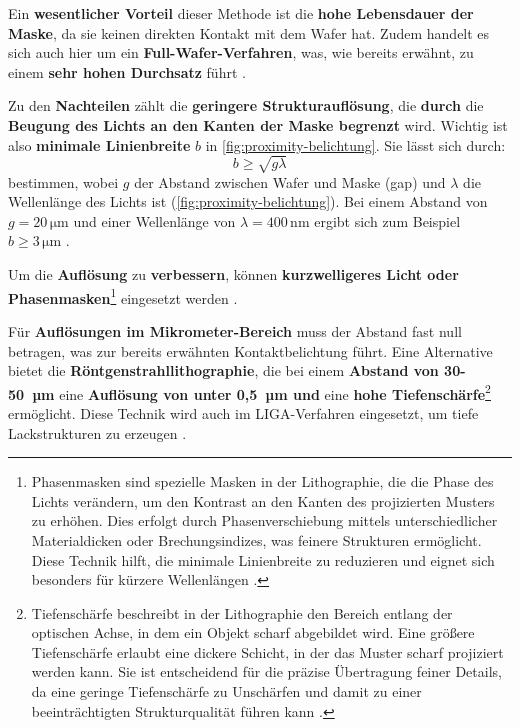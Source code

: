 \documentclass{article} %
\begin{document}
\vspace{1em}

Ein \textbf{wesentlicher Vorteil} dieser Methode ist die \textbf{hohe Lebensdauer der Maske}, da sie keinen direkten Kontakt mit dem Wafer hat. Zudem handelt es sich auch hier um ein \textbf{Full-Wafer-Verfahren}, was, wie bereits erwähnt, zu einem \textbf{sehr hohen Durchsatz} führt \cite{schmid2024}.

\vspace{1em}

Zu den \textbf{Nachteilen} zählt die \textbf{geringere Strukturauflösung}, die \textbf{durch} die \textbf{Beugung des Lichts an den Kanten der Maske begrenzt} wird. Wichtig ist also \textbf{minimale Linienbreite} $b$ in \autoref{fig:proximity-belichtung}. Sie lässt sich durch: 
$$
b \geq \sqrt{g\lambda}
$$ 
bestimmen, wobei $g$ der Abstand zwischen Wafer und Maske (gap) und $\lambda$ die Wellenlänge des Lichts ist (\autoref{fig:proximity-belichtung}). Bei einem Abstand von $g = 20 \, \mathrm{\mu m}$ und einer Wellenlänge von $\lambda = 400 \, \mathrm{nm}$ ergibt sich zum Beispiel $b \geq 3 \, \mathrm{\mu m}$ \cite{schmid2024}. 

\vspace{1em}

Um die \textbf{Auflösung} zu \textbf{verbessern}, können \textbf{kurzwelligeres Licht oder Phasenmasken}\footnote{Phasenmasken sind spezielle Masken in der Lithographie, die die Phase des Lichts verändern, um den Kontrast an den Kanten des projizierten Musters zu erhöhen. Dies erfolgt durch Phasenverschiebung mittels unterschiedlicher Materialdicken oder Brechungsindizes, was feinere Strukturen ermöglicht. Diese Technik hilft, die minimale Linienbreite zu reduzieren und eignet sich besonders für kürzere Wellenlängen \cite{Lin1992, Levenson1982, Mack2006}.} eingesetzt werden \cite{schmid2024}.

\vspace{1em}

Für \textbf{Auflösungen im Mikrometer-Bereich} muss der Abstand fast null betragen, was zur bereits erwähnten Kontaktbelichtung führt. Eine Alternative bietet die \textbf{Röntgenstrahllithographie}, die bei einem \textbf{Abstand von 30-50~µm} eine \textbf{Auflösung von unter 0,5~µm und} eine \textbf{hohe Tiefenschärfe}\footnote{Tiefenschärfe beschreibt in der Lithographie den Bereich entlang der optischen Achse, in dem ein Objekt scharf abgebildet wird. Eine größere Tiefenschärfe erlaubt eine dickere Schicht, in der das Muster scharf projiziert werden kann. Sie ist entscheidend für die präzise Übertragung feiner Details, da eine geringe Tiefenschärfe zu Unschärfen und damit zu einer beeinträchtigten Strukturqualität führen kann \cite{Mack2006}.} ermöglicht. Diese Technik wird auch im LIGA-Verfahren eingesetzt, um tiefe Lackstrukturen zu erzeugen \cite{Mescheder2004}.
\end{document}
